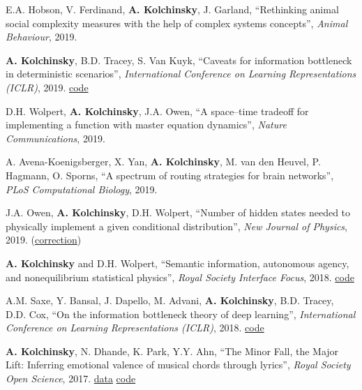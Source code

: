 E.A. Hobson, V. Ferdinand, \textbf{A. Kolchinsky}, J. Garland, 
``Rethinking animal social complexity measures with the help of complex systems concepts'', 
\emph{Animal Behaviour}, 2019. 

\textbf{A. Kolchinsky}, B.D. Tracey, S. Van Kuyk, ``Caveats for information bottleneck in deterministic scenarios'', \emph{International Conference on Learning Representations (ICLR)}, 2019. 
\href{https://github.com/artemyk/ibcurve}{code}

D.H. Wolpert, \textbf{A. Kolchinsky}, J.A. Owen, ``A space–time tradeoff for implementing a function with master equation dynamics'', \emph{Nature Communications}, 2019. 

A. Avena-Koenigsberger, X. Yan, \textbf{A. Kolchinsky}, M. van den Heuvel, P. Hagmann, O. Sporns, 
``A spectrum of routing strategies for brain networks'', \emph{PLoS Computational Biology}, 2019. 

J.A. Owen, \textbf{A. Kolchinsky}, D.H. Wolpert, ``Number of hidden states needed to physically implement a given conditional distribution'', \emph{New Journal of Physics}, 2019. (\href{https://iopscience.iop.org/article/10.1088/1367-2630/ab60f8}{correction}) 

\textbf{A. Kolchinsky} and D.H. Wolpert, 
``Semantic information, autonomous agency, and nonequilibrium statistical physics'', 
\emph{Royal Society Interface Focus}, 2018. 
\href{https://github.com/artemyk/semantic_information/}{code}

A.M. Saxe, Y. Bansal, J. Dapello, M. Advani, \textbf{A. Kolchinsky}, B.D. Tracey, D.D. Cox, 
``On the information bottleneck theory of deep learning'', \emph{International Conference on Learning Representations (ICLR)}, 2018. 
 \href{https://github.com/artemyk/ibsgd/tree/iclr2018}{code}

\textbf{A. Kolchinsky}, N. Dhande, K. Park, Y.Y. Ahn, ``The Minor Fall, the Major Lift: Inferring emotional valence of musical chords through lyrics'', \emph{Royal Society Open Science}, 2017. 
\href{https://doi.org/10.6084/m9.figshare.5413060.v1.}{data} 
\href{https://github.com/artemyk/chordsentiment}{code}

